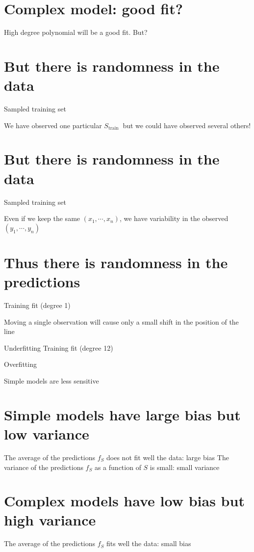 \section*{Complex model: good fit?}


High degree polynomial will be a good fit. But?

\section*{But there is randomness in the data}
Sampled training set


We have observed one particular $S_{\text {train }}$ but we could have observed several others!

\section*{But there is randomness in the data}
Sampled training set


Even if we keep the same $\left(x_{1}, \cdots, x_{n}\right)$, we have variability in the observed $\left(y_{1}, \cdots, y_{n}\right)$

\section*{Thus there is randomness in the predictions}
Training fit (degree 1)


Moving a single observation will cause only a small shift in the position of the line

Underfitting
Training fit (degree 12)


Overfitting

Simple models are less sensitive

\section*{Simple models have large bias but low variance}

The average of the predictions $f_{S}$ does not fit well the data: large bias The variance of the predictions $f_{S}$ as a function of $S$ is small: small variance

\section*{Complex models have low bias but high variance}

The average of the predictions $f_{S}$ fits well the data: small bias

